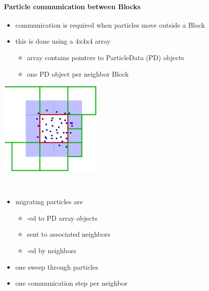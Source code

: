 %
%
%
%

\begin{frame}[fragile,label=ss-recent-particles] 
  \secframetitle{\ssRecentParticles}
  \framesubtitle{Particle communication between Blocks}
\begin{itemize}
\item communication is required when particles move outside a Block 
\item this is done using a 4x4x4 array
\begin{itemize}
\item array contains pointers to ParticleData (PD) objects
\item one PD object per neighbor Block
\end{itemize}

\end{itemize}
\begin{minipage}{1.8in}
\includegraphics[width=2.0in]{particle-refresh-2.pdf}
\end{minipage} \ 
\begin{minipage}{2.7in}
\begin{itemize}
\item migrating particles are
\begin{itemize}
\item {}-ed to PD array objects
\item sent to associated neighbors
\item {}-ed by neighbors
\end{itemize}
\item one sweep through particles
\item one communication step per neighbor
\end{itemize}
\end{minipage}
\end{frame}

